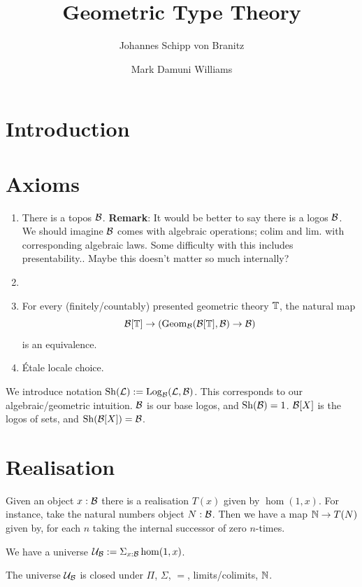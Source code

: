 \documentclass{article}
\title{Geometric Type Theory}
\author{Johannes Schipp von Branitz \and Mark Damuni Williams}
\begin{document}
\maketitle


\section{Introduction}

\section{Axioms}

\begin{enumerate}
  \item There is a topos $\mathcal{B}$.
        \textbf{Remark}: It would be better to say there is a logos $\mathcal{B}$. 
        We should imagine $\mathcal{B}$ comes with algebraic operations; $\mathrm{colim}$ and $\mathrm{lim}$. with corresponding algebraic laws. Some difficulty with this includes presentability.. Maybe this doesn't matter so much internally? 

  \item {}
  \item For every (finitely/countably) presented geometric theory $\mathbb{T}$, the natural map
    \[ \mathcal{B}[\mathbb{T}] \to (\mathrm{Geom}_{\mathcal{B}}(\mathcal{B}[\mathbb{T}], \mathcal{B}) \to \mathcal{B}) \]
  is an equivalence.
  \item \'Etale locale choice.
\end{enumerate}

We introduce notation $\mathrm{Sh}(\mathcal{L}) := \mathrm{Log}_{\mathcal{B}}(\mathcal{L}, \mathcal{B})$. This corresponds to our algebraic/geometric intuition. 
$\mathcal{B}$ is our base logos, and  $\mathrm{Sh}(\mathcal{B}) = 1$.
$\mathcal{B}[X]$ is the logos of sets, and $\mathrm{Sh}(\mathcal{B}[X]) = \mathcal{B}$.  

\section{Realisation}

Given an object $x : \mathcal{B}$ there is a realisation $T(x)$ given by $\hom(1, x)$. 
For instance, take the natural numbers object $N : \mathcal{B}$.
Then we have a map $\mathbb{N} \to T(N)$ given by, for each $n$ taking the internal successor of zero $n$-times. 

We have a universe $\mathcal{U}_{\mathcal{B}} := \Sigma_{x : \mathcal{B}} \hom(1, x)$.
\begin{lemma}
  The universe $\mathcal{U}_{\mathcal{B}}$ is closed under $\Pi$, $\Sigma$, $=$, limits/colimits, $\mathbb{N}$.
\end{lemma}
\end{document}
